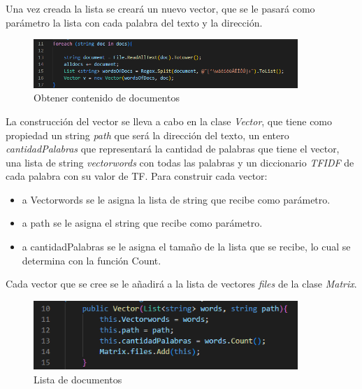 \documentclass[10pt, letterpaper]{article}
\begin{document}
        Una vez creada la lista se creará un nuevo vector, que se le pasará como parámetro la lista 
        con cada palabra del texto y la dirección.
        
        \begin{figure}[h]
            \centering
            \label{imag:cargardocs}
            \includegraphics[width=10cm]{CargarDocs.png}
            \caption[]{\footnotesize Obtener contenido de documentos}
        \end{figure}

        La construcción del vector se lleva a cabo en la clase \textit{Vector}, que tiene como propiedad un
        string \textit{path} que será la dirección del texto, un entero \textit{cantidadPalabras} que representará la
        cantidad de palabras que tiene el vector, una lista de string \textit{vectorwords} con todas las 
        palabras y un diccionario \textit{TFIDF} de cada palabra con su valor de TF. Para construir cada
        vector:

        \begin{itemize}
            \item  a Vectorwords se le asigna la lista de string que recibe como parámetro.
            \item  a path se le asigna el string que recibe como parámetro.
            \item  a cantidadPalabras se le asigna el tamaño de la lista que se recibe,
             lo cual se determina con la función Count.
        \end{itemize}


        \newpage

        Cada vector que se cree se le añadirá a la lista de vectores \textit{files} de la clase \textit{Matrix}.

        \begin{figure}[h]

            \centering
            \label{imag: docvectores}
            \includegraphics[width=10cm]{DocVectors.png}
            \caption[]{ \footnotesize Lista de documentos}

        \end{figure}
\end{document}
